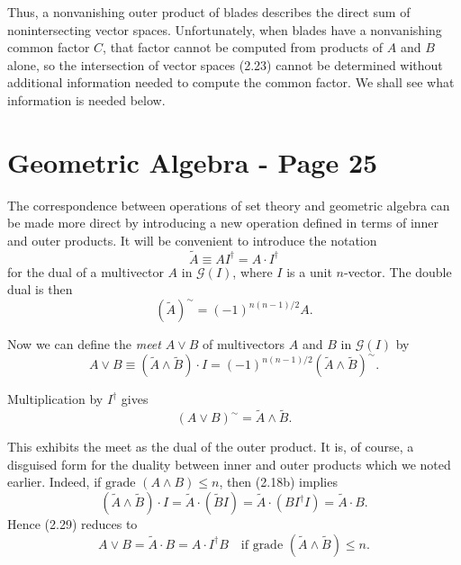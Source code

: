 \documentclass[fleqn]{scrartcl}
\numberwithin{equation}{section}
\begin{document}
\noindent Thus, a nonvanishing outer product of blades describes the direct sum of nonintersecting vector spaces. Unfortunately, when blades have a nonvanishing common factor \(C\), that factor cannot be computed from products of \(A\) and \(B\) alone, so the intersection of vector spaces (2.23) cannot be determined without additional information needed to compute the common factor. We shall see what information is needed below.

\section*{Geometric Algebra - Page 25}

\noindent The correspondence between operations of set theory and geometric algebra can be made more direct by introducing a new operation defined in terms of inner and outer products. It will be convenient to introduce the notation
\begin{equation}
\tilde{A} \equiv A I^{\dagger} = A \cdot I^{\dagger} \tag{2.26}
\end{equation}
for the dual of a multivector \(A\) in \(\mathscr{G}(I)\), where \(I\) is a unit \(n\)-vector. The double dual is then
\begin{equation}
(\tilde{A})^{\sim} = (-1)^{n(n-1)/2} A. \tag{2.27}
\end{equation}

\noindent Now we can define the \textit{meet} \(A \vee B\) of multivectors \(A\) and \(B\) in \(\mathscr{G}(I)\) by
\begin{equation}
A \vee B \equiv (\tilde{A} \wedge \tilde{B}) \cdot I = (-1)^{n(n-1)/2} (\tilde{A} \wedge \tilde{B})^{\sim}. \tag{2.28}
\end{equation}

\noindent Multiplication by \(I^{\dagger}\) gives
\begin{equation}
(A \vee B)^{\sim} = \tilde{A} \wedge \tilde{B}. \tag{2.29}
\end{equation}

\noindent This exhibits the meet as the dual of the outer product. It is, of course, a disguised form for the duality between inner and outer products which we noted earlier. Indeed, if \(\text{grade } (A \wedge B) \leq n\), then (2.18b) implies
\[
(\tilde{A} \wedge \tilde{B}) \cdot I = \tilde{A} \cdot (\tilde{B}I) = \tilde{A} \cdot (BI^{\dagger}I) = \tilde{A} \cdot B.
\]
Hence (2.29) reduces to
\begin{equation}
A \vee B = \tilde{A} \cdot B = A \cdot I^{\dagger}B \quad \text{if grade } (\tilde{A} \wedge \tilde{B}) \leq n. \tag{2.30}
\end{equation}
\end{document}
